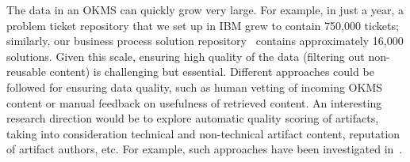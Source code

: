 The data in an OKMS can quickly grow very large. For example, in just a year, a
problem ticket repository that we set up in IBM grew to contain 750,000 tickets;
similarly, our business process solution repository~\cite{Goodwin:2012b}
contains approximately 16,000 solutions. Given this scale, ensuring high quality
of the data (\eg filtering out non-reusable content) is challenging but
essential. Different approaches could be followed for ensuring data quality,
such as human vetting of incoming OKMS content or manual feedback on usefulness
of retrieved content. An interesting research direction would be to explore
automatic quality scoring of artifacts, taking into consideration technical and
non-technical artifact content, reputation of artifact authors, etc. For
example, such approaches have been investigated in~\cite{Majumdar:2011}.



